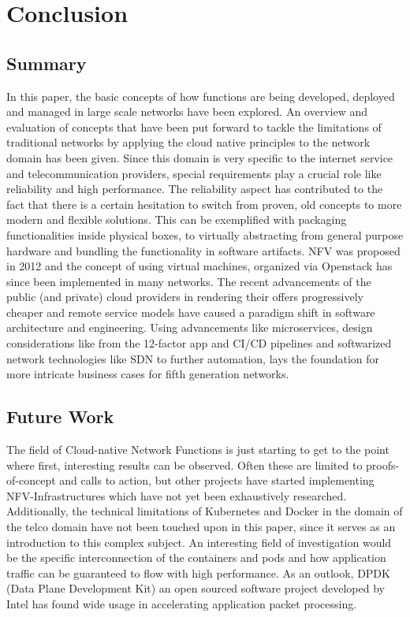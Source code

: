 \section{Conclusion}

\subsection{Summary}
In this paper, the basic concepts of how functions are being developed, deployed and managed in large scale networks have been explored. An overview and evaluation of concepts that have been put forward to tackle the limitations of traditional networks by applying the cloud native principles to the network domain has been given.
Since this domain is very specific to the internet service and telecommunication providers, special requirements play a crucial role like reliability and high performance. The reliability aspect has contributed to the fact that there is a certain hesitation to switch from proven, old concepts to more modern and flexible solutions. This can be exemplified with packaging functionalities inside physical boxes, to virtually abstracting from general purpose hardware and bundling the functionality in software artifacts. NFV was proposed in 2012 and the concept of using virtual machines, organized via Openstack has since been implemented in many networks. The recent advancements of the public (and private) cloud providers in rendering their offers progressively cheaper and remote service models have caused a paradigm shift in software architecture and engineering. Using advancements like microservices, design considerations like from the 12-factor app and CI/CD pipelines and softwarized network technologies like SDN to further automation, lays the foundation for more intricate business cases for fifth generation networks.

\subsection{Future Work}
The field of Cloud-native Network Functions is just starting to get to the point where first, interesting results can be observed. Often these are limited to proofs-of-concept and calls to action, but other projects have started implementing NFV-Infrastructures which have not yet been exhaustively researched. Additionally, the technical limitations of Kubernetes and Docker in the domain of the telco domain have not been touched upon in this paper, since it serves as an introduction to this complex subject. An interesting field of investigation would be the specific interconnection of the containers and pods and how application traffic can be guaranteed to flow with high performance. As an outlook, DPDK (Data Plane Development Kit) an open sourced software project developed by Intel has found wide usage in accelerating application packet processing. 